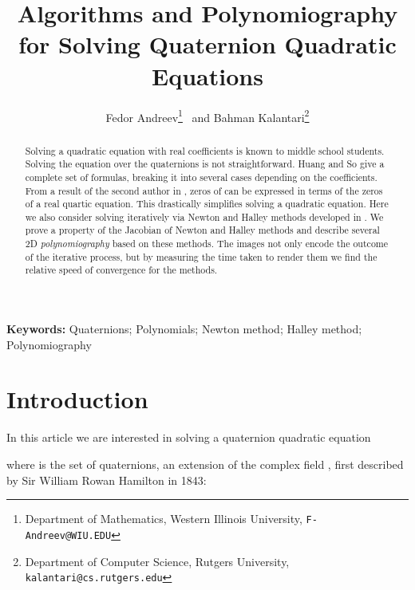 \documentclass{article}
\theoremstyle{definition}
\begin{document}
\title{Algorithms and Polynomiography for Solving Quaternion Quadratic Equations}
\author{Fedor Andreev\thanks{Department of Mathematics,
        Western Illinois University, {\tt F-Andreev@WIU.EDU}}
        ~and Bahman Kalantari\thanks{Department of Computer Science,
        Rutgers University, {\tt kalantari@cs.rutgers.edu}}}
\date{}
\maketitle

\date{}
\maketitle






\begin{abstract}
Solving a quadratic equation   with real coefficients is known to middle school students.  Solving the equation over the quaternions is not straightforward. Huang and So \cite{Huang} give a complete set of formulas, breaking it into several cases depending on the coefficients.  From a result of the second author in \cite{kalQ}, zeros of  can be expressed in terms of the zeros of a real quartic equation. This drastically simplifies solving a quadratic equation. Here we also consider solving  iteratively via Newton and Halley methods developed in \cite{kalQ}. We prove a property of the Jacobian of Newton and Halley methods and describe several 2D {\it polynomiography} based on these methods. The images not only encode the outcome of the iterative process, but by measuring the time taken to render them we find the relative speed of convergence for the methods.

\end{abstract}

{\bf Keywords:}    Quaternions; Polynomials; Newton method; Halley method; Polynomiography





\section{Introduction} In this article we are interested in solving a quaternion quadratic  equation

where  is the set of quaternions, an extension of the
complex field , first described by Sir William Rowan
Hamilton in 1843:
\end{document}
